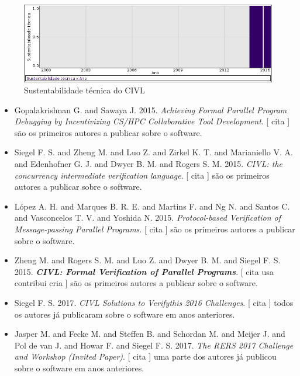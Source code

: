 \begin{figure}[h]
  \center
  \includegraphics[scale=0.50]{imagens/softwares-charts/civl.png}
  \caption{Sustentabilidade técnica do CIVL}
\end{figure}


\begin{itemize}
\item Gopalakrishnan G. and Sawaya J.
      2015.
        \textit{ Achieving Formal Parallel Program Debugging by Incentivizing CS/HPC Collaborative Tool Development}.
      [
          cita
      ]
são os primeiros autores a publicar sobre o software.
\item Siegel F. S. and Zheng M. and Luo Z. and Zirkel K. T. and Marianiello V. A. and Edenhofner G. J. and Dwyer B. M. and Rogers S. M.
      2015.
        \textit{ CIVL: the concurrency intermediate verification language}.
      [
          cita
      ]
são os primeiros autores a publicar sobre o software.
\item L\'{o}pez A. H. and Marques B. R. E. and Martins F. and Ng N. and Santos C. and Vasconcelos T. V. and Yoshida N.
      2015.
        \textit{ Protocol-based Verification of Message-passing Parallel Programs}.
      [
          cita
      ]
são os primeiros autores a publicar sobre o software.
\item Zheng M. and Rogers S. M. and Luo Z. and Dwyer B. M. and Siegel F. S.
      2015.
        \textbf{\textit{ CIVL: Formal Verification of Parallel Programs}}.
      [
          cita
          usa
          contribui
          cria
      ]
são os primeiros autores a publicar sobre o software.
\item Siegel F. S.
      2017.
        \textit{ CIVL Solutions to Verifythis 2016 Challenges}.
      [
          cita
      ]
todos os autores já publicaram sobre o software em anos anteriores.
\item Jasper M. and Fecke M. and Steffen B. and Schordan M. and Meijer J. and Pol de van J. and Howar F. and Siegel F. S.
      2017.
        \textit{ The RERS 2017 Challenge and Workshop (Invited Paper)}.
      [
          cita
      ]
uma parte dos autores já publicou sobre o software em anos anteriores.
\end{itemize}
